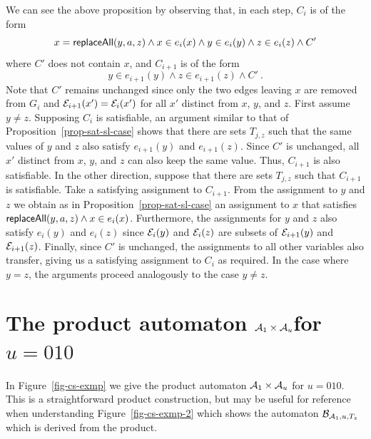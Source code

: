 We can see the above proposition by observing that, in each step, $C_i$ is of the form
\[
    x = \mathsf{replaceAll}(y, a, z) \wedge x \in e_i(x) \wedge y \in e_i(y) \wedge z \in e_i(z) \wedge C'
\]
where $C'$ does not contain $x$, and $C_{i+1}$ is of the form
\[
    y \in e_{i+1}(y) \wedge z \in e_{i+1}(z) \wedge C' \ .
\]
Note that $C'$ remains unchanged since only the two edges leaving $x$ are removed from $G_i$ and $\mathcal{E}_{i+1}(x') = \mathcal{E}_i(x')$ for all $x'$ distinct from $x$, $y$, and $z$.
First assume $y \neq z$.
Supposing $C_i$ is satisfiable, an argument similar to that of Proposition~\ref{prop-sat-sl-case} shows that there are sets $T_{j,z}$ such that the same values of $y$ and $z$ also satisfy $e_{i+1}(y)$ and $e_{i+1}(z)$.
Since $C'$ is unchanged, all $x'$ distinct from $x$, $y$, and $z$ can also keep the same value.
Thus, $C_{i+1}$ is also satisfiable.
In the other direction, suppose that there are sets $T_{j, z}$ such that $C_{i+1}$ is satisfiable. Take a satisfying assignment to $C_{i+1}$.
From the assignment to $y$ and $z$ we obtain as in Proposition~\ref{prop-sat-sl-case} an assignment to $x$ that satisfies $\mathsf{replaceAll}(y, a, z) \wedge x \in e_i(x)$.
Furthermore, the assignments for $y$ and $z$ also satisfy $e_i(y)$ and $e_i(z)$ since $\mathcal{E}_i(y)$ and $\mathcal{E}_i(z)$ are subsets of $\mathcal{E}_{i+1}(y)$ and $\mathcal{E}_{i+1}(z)$.
Finally, since $C'$ is unchanged, the assignments to all other variables also transfer, giving us a satisfying assignment to $C_i$ as required.
In the case where $y = z$, the arguments proceed analogously to the case $y \neq z$.

\def\prodauttitle{$\cA_1 \times \cA_u$}
\def\defutitle{$u = 010$}
\section{The product automaton \protect\prodauttitle for \protect\defutitle}

In Figure~\ref{fig-cs-exmp} we give the product automaton $\mathcal{A}_1 \times \mathcal{A}_u$ for $u = 010$.
This is a straightforward product construction, but may be useful for reference when understanding Figure~\ref{fig-cs-exmp-2} which shows the automaton $\mathcal{B}_{\mathcal{A}_1, u, T_z}$ which is derived from the product.

